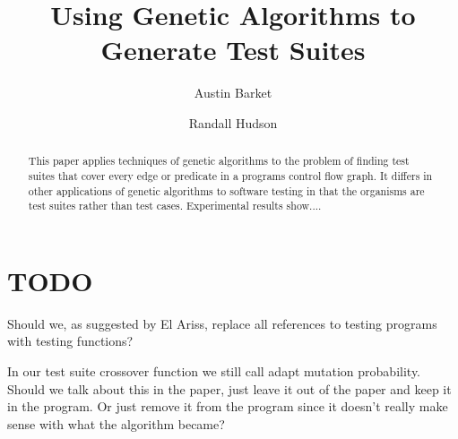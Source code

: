 \documentclass[runningheads]{llncs}
\begin{document}
\pagestyle{headings}
\mainmatter

\title{Using Genetic Algorithms to Generate Test Suites}
\titlerunning{}
\author{Austin Barket \and Randall Hudson}
 \maketitle

\begin{abstract}
This paper applies techniques of genetic algorithms to the problem of finding test suites that cover every edge or predicate in a programs control flow graph. It differs in other applications of genetic algorithms to software testing in that the organisms are test suites rather than test cases. Experimental results show....
\end{abstract}


\section{TODO}

Should we, as suggested by El Ariss, replace all references to testing programs with testing functions?

In our test suite crossover function we still call adapt mutation probability. Should we talk about this in the paper, just leave it out of the paper and keep it in the program. Or just remove it from the program since it doesn't really make sense with what the algorithm became?
\end{document}
